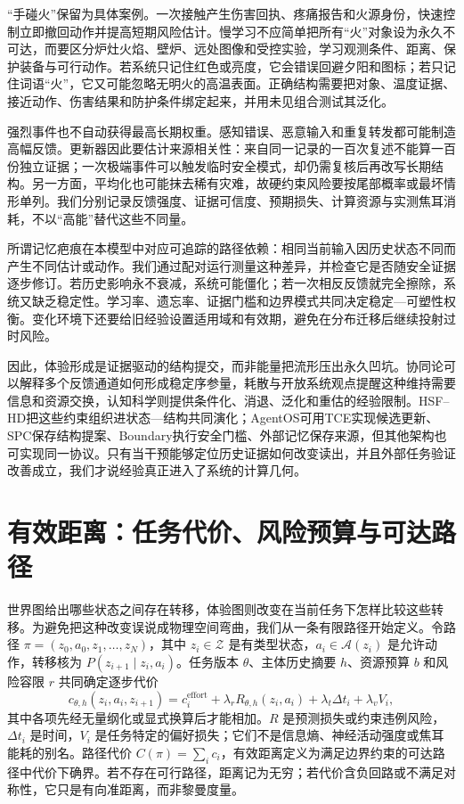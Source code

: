 “手碰火”保留为具体案例。一次接触产生伤害回执、疼痛报告和火源身份，快速控制立即撤回动作并提高短期风险估计。慢学习不应简单把所有“火”对象设为永久不可达，而要区分炉灶火焰、壁炉、远处图像和受控实验，学习观测条件、距离、保护装备与可行动作。若系统只记住红色或亮度，它会错误回避夕阳和图标；若只记住词语“火”，它又可能忽略无明火的高温表面。正确结构需要把对象、温度证据、接近动作、伤害结果和防护条件绑定起来，并用未见组合测试其泛化。

强烈事件也不自动获得最高长期权重。感知错误、恶意输入和重复转发都可能制造高幅反馈。更新器因此要估计来源相关性：来自同一记录的一百次复述不能算一百份独立证据；一次极端事件可以触发临时安全模式，却仍需复核后再改写长期结构。另一方面，平均化也可能抹去稀有灾难，故硬约束风险要按尾部概率或最坏情形单列。我们分别记录反馈强度、证据可信度、预期损失、计算资源与实测焦耳消耗，不以“高能”替代这些不同量。

所谓记忆疤痕在本模型中对应可追踪的路径依赖：相同当前输入因历史状态不同而产生不同估计或动作。我们通过配对运行测量这种差异，并检查它是否随安全证据逐步修订。若历史影响永不衰减，系统可能僵化；若一次相反反馈就完全擦除，系统又缺乏稳定性。学习率、遗忘率、证据门槛和边界模式共同决定稳定—可塑性权衡。变化环境下还要给旧经验设置适用域和有效期，避免在分布迁移后继续投射过时风险。

因此，体验形成是证据驱动的结构提交，而非能量把流形压出永久凹坑。协同论可以解释多个反馈通道如何形成稳定序参量，耗散与开放系统观点提醒这种维持需要信息和资源交换，认知科学则提供条件化、消退、泛化和重估的经验限制。HSF--HD把这些约束组织进状态—结构共同演化；AgentOS可用TCE实现候选更新、SPC保存结构提案、Boundary执行安全门槛、外部记忆保存来源，但其他架构也可实现同一协议。只有当干预能够定位历史证据如何改变读出，并且外部任务验证改善成立，我们才说经验真正进入了系统的计算几何。

\section{有效距离：任务代价、风险预算与可达路径}
\label{sec:section_8091}
世界图给出哪些状态之间存在转移，体验图则改变在当前任务下怎样比较这些转移。为避免把这种改变误说成物理空间弯曲，我们从一条有限路径开始定义。令路径 $\pi=(z_0,a_0,z_1,\ldots,z_N)$，其中 $z_i\in\mathcal Z$ 是有类型状态，$a_i\in\mathcal A(z_i)$ 是允许动作，转移核为 $P(z_{i+1}\mid z_i,a_i)$。任务版本 $\theta$、主体历史摘要 $h$、资源预算 $b$ 和风险容限 $r$ 共同确定逐步代价
\[
c_{\theta,h}(z_i,a_i,z_{i+1})=c^{\mathrm{effort}}_i+\lambda_r R_{\theta,h}(z_i,a_i)+\lambda_t\Delta t_i+\lambda_v V_i,
\]
其中各项先经无量纲化或显式换算后才能相加。$R$ 是预测损失或约束违例风险，$\Delta t_i$ 是时间，$V_i$ 是任务特定的偏好损失；它们不是信息熵、神经活动强度或焦耳能耗的别名。路径代价 $C(\pi)=\sum_i c_i$，有效距离定义为满足边界约束的可达路径中代价下确界。若不存在可行路径，距离记为无穷；若代价含负回路或不满足对称性，它只是有向准距离，而非黎曼度量。

